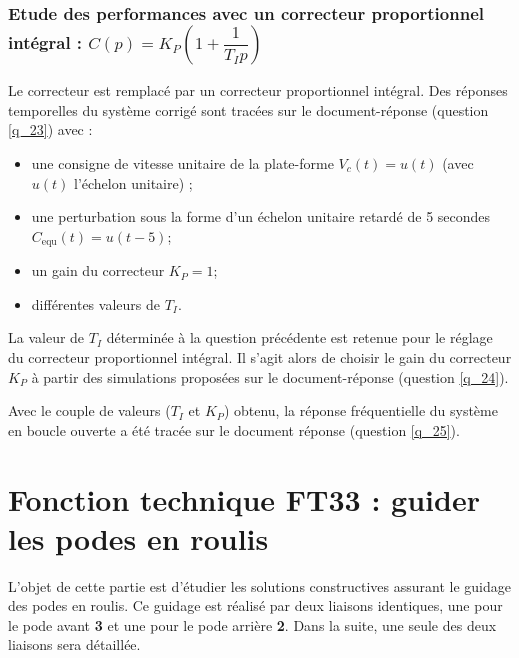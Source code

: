 \subsubsection{Etude des performances avec un correcteur proportionnel intégral : $C(p)={K_P}\left(1+\dfrac{1}{T_I p}\right)$}

Le correcteur est remplacé par un correcteur proportionnel intégral. Des réponses temporelles du système corrigé sont tracées sur le document-réponse (question \ref{q_23}) avec :
\begin{itemize}
\item une consigne de vitesse unitaire de la plate-forme $V_c (t)= u(t)$ (avec $u(t)$ l’échelon unitaire) ;
\item une perturbation sous la forme d’un échelon unitaire retardé de 5 secondes $C_{\text{equ}} (t) = u(t - 5)$;
\item un gain du correcteur $K_P = 1$;
\item différentes valeurs de $T_I$.
\end{itemize}


La valeur de $T_I$ déterminée à la question précédente est retenue pour le réglage du correcteur proportionnel intégral. Il s’agit alors de choisir le gain du correcteur $K_P$ à partir des simulations proposées sur le document-réponse (question \ref{q_24}).


Avec le couple de valeurs ($T_I$ et $K_P$) obtenu, la réponse fréquentielle du système en boucle ouverte a été tracée sur le document réponse (question \ref{q_25}).


\section{Fonction technique FT33 : guider les podes en roulis}

L’objet de cette partie est d’étudier les solutions constructives assurant le guidage des podes en roulis. Ce guidage est réalisé par deux liaisons identiques, une pour le pode avant \textbf{3} et une pour le pode arrière \textbf{2}. Dans la suite, une seule des deux liaisons sera détaillée.

